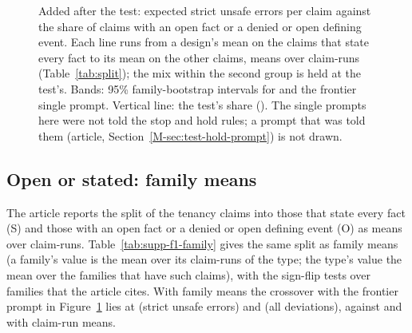 \begin{figure}[h]
\centering
{}
\caption{Added after the test: expected strict unsafe errors per claim against the share of claims with an open fact or a denied or open defining event. Each line runs from a design's mean on the claims that state every fact to its mean on the other claims, means over claim-runs (Table~\ref{tab:split}); the mix within the second group is held at the test's. Bands: 95\% family-bootstrap intervals for \casepath and the frontier single prompt. Vertical line: the test's share (\sthreeFTwoTestShare). The single prompts here were not told the stop and hold rules; a prompt that was told them (article, Section~\ref{M-sec:test-hold-prompt}) is not drawn.}
\label{fig:share}
\end{figure}

\subsection{Open or stated: family means}
\label{supp:f1-family}

The article reports the split of the tenancy claims into those that state every fact (S) and those with an open fact or a denied or open defining event (O) as means over claim-runs. Table~\ref{tab:supp-f1-family} gives the same split as family means (a family's value is the mean over its claim-runs of the type; the type's value the mean over the families that have such claims), with the sign-flip tests over families that the article cites. With family means the crossover with the frontier prompt in Figure~\ref{fig:share} lies at \sthreeFTwoStrictCrossCasePathRicFrontierFamily{} (strict unsafe errors) and \sthreeFTwoAllDevCrossCasePathRicFrontierFamily{} (all deviations), against \sthreeFTwoStrictCrossCasePathRicFrontier{} and \sthreeFTwoAllDevCrossCasePathRicFrontier{} with claim-run means.

